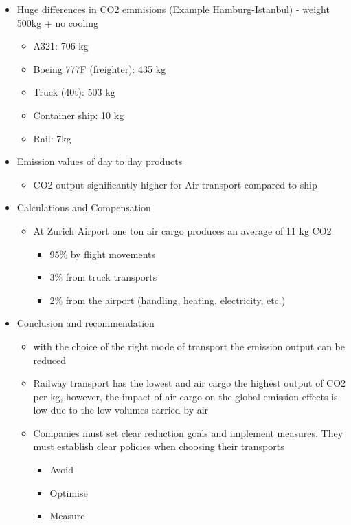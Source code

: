 \documentclass[9pt, landscape, fleqn]{scrartcl}
\begin{document}
\begin{multicols*}{3}
\begin{itemize}
    \item Huge differences in CO2 emmisions (Example Hamburg-Istanbul) - weight 500kg + no cooling 
    \begin{itemize}
        \item A321: 706 kg 
        \item Boeing 777F (freighter): 435 kg 
        \item Truck (40t): 503 kg 
        \item Container ship: 10 kg 
        \item Rail: 7kg  
    \end{itemize}
    \item Emission values of day to day products 
    \begin{itemize}
        \item CO2 output significantly higher for Air transport compared to ship 
    \end{itemize}
    \item Calculations and Compensation 
    \begin{itemize}
        \item At Zurich Airport one ton air cargo produces an average of 11 kg CO2
        \begin{itemize}
            \item 95\% by flight movements
            \item 3\% from truck transports
            \item 2\% from the airport (handling, heating, electricity, etc.)
        \end{itemize}
    \end{itemize}
    \item Conclusion and recommendation
    \begin{itemize}
        \item with the choice of the right mode of transport the emission output can be reduced
        \item Railway transport has the lowest and air cargo the highest output of CO2 per kg, however, the impact of air cargo on the global emission effects is low due to the low volumes carried by air
        \item Companies must set clear reduction goals and implement measures. They must establish clear policies when choosing their transports
        \begin{itemize}
            \item Avoid
            \item Optimise 
            \item Measure 

\end{itemize}
\end{itemize}
\end{itemize}
\end{multicols*}
\end{document}
